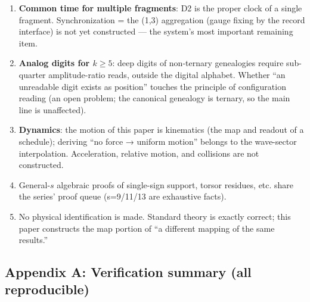 \documentclass[
]{ltjsarticle}
\providecommand{\tightlist}{%
  \setlength{\itemsep}{0pt}\setlength{\parskip}{0pt}}
\begin{document}
\begin{enumerate}
\def\labelenumi{\arabic{enumi}.}
\tightlist
\item
  \textbf{Common time for multiple fragments}: D2 is the proper clock of
  a single fragment. Synchronization = the (1,3) aggregation (gauge
  fixing by the record interface) is not yet constructed --- the
  system's most important remaining item.
\item
  \textbf{Analog digits for \(k\ge5\)}: deep digits of non-ternary
  genealogies require sub-quarter amplitude-ratio reads, outside the
  digital alphabet. Whether ``an unreadable digit exists as position''
  touches the principle of configuration reading (an open problem; the
  canonical genealogy is ternary, so the main line is unaffected).
\item
  \textbf{Dynamics}: the motion of this paper is kinematics (the map and
  readout of a schedule); deriving ``no force → uniform motion'' belongs
  to the wave-sector interpolation. Acceleration, relative motion, and
  collisions are not constructed.
\item
  General-\(s\) algebraic proofs of single-sign support, torsor
  residues, etc. share the series' proof queue (s=9/11/13 are exhaustive
  facts).
\item
  No physical identification is made. Standard theory is exactly
  correct; this paper constructs the map portion of ``a different
  mapping of the same results.''
\end{enumerate}

\subsection{Appendix A: Verification summary (all
reproducible)}\label{appendix-a-verification-summary-all-reproducible}
\end{document}
